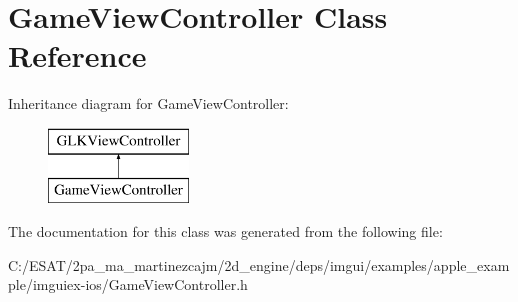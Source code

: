 \hypertarget{interface_game_view_controller}{}\section{Game\+View\+Controller Class Reference}
\label{interface_game_view_controller}
Inheritance diagram for Game\+View\+Controller\+:\begin{figure}[H]
\begin{center}
\leavevmode
\includegraphics[height=2.000000cm]{interface_game_view_controller}
\end{center}
\end{figure}


The documentation for this class was generated from the following file\+:\begin{DoxyCompactItemize}
\item 
C\+:/\+E\+S\+A\+T/2pa\+\_\+ma\+\_\+martinezcajm/2d\+\_\+engine/deps/imgui/examples/apple\+\_\+example/imguiex-\/ios/Game\+View\+Controller.\+h\end{DoxyCompactItemize}
